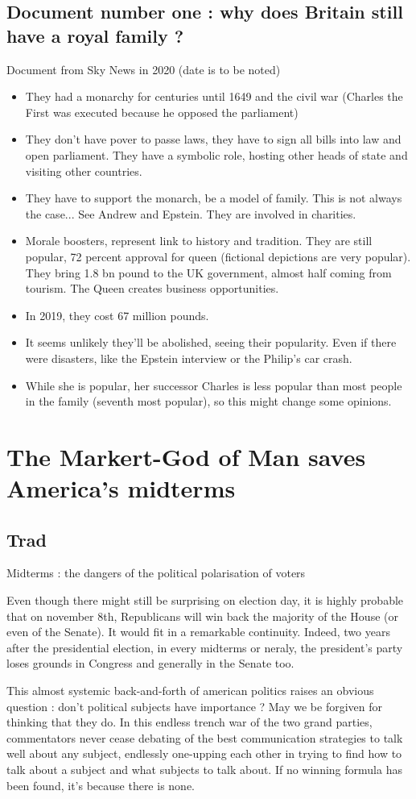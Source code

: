 \documentclass[a4paper,12pt]{book}
\begin{document}
\section{Document number one : why does Britain still have a royal family ?}
Document from Sky News in 2020 (date is to be noted)
\begin{itemize}
\item They had a monarchy for centuries until 1649 and the civil war (Charles the First was executed because he opposed the parliament)
\item They don't have pover to passe laws, they have to sign all bills into law and open parliament. They have a symbolic role, hosting other heads of state and visiting other countries.
\item They have to support the monarch, be a model of family. This is not always the case... See Andrew and Epstein. They are involved in charities.
\item Morale boosters, represent link to history and tradition. They are still popular, 72 percent approval for queen (fictional depictions are very popular). They bring 1.8 bn pound to the UK government, almost half coming from tourism. The Queen creates business opportunities.
\item In 2019, they cost 67 million pounds.
\item It seems unlikely they'll be abolished, seeing their popularity. Even if there were disasters, like the Epstein interview or the Philip's car crash.
\item While she is popular, her successor Charles is less popular than most people in the family (seventh most popular), so this might change some opinions.
\end{itemize}




\chapter{The Markert-God of Man saves America's midterms}
\section{Trad} Midterms : the dangers of the political polarisation of voters \par
Even though there might still be surprising on election day, it is highly probable that on november 8th, Republicans will win back the majority of the House (or even of the Senate). It would fit in a remarkable continuity. Indeed, two years after the presidential election, in every midterms or neraly, the president's party loses grounds in Congress and generally in the Senate too.
\par This almost systemic back-and-forth of american politics raises an obvious question : don't political subjects have importance ? May we be forgiven for thinking that they do. In this endless trench war of the two grand parties, commentators never cease debating of the best communication strategies to talk well about any subject, endlessly one-upping each other in trying to find how to talk about a subject and what subjects to talk about. If no winning formula has been found, it's because there is none. 
\end{document}
